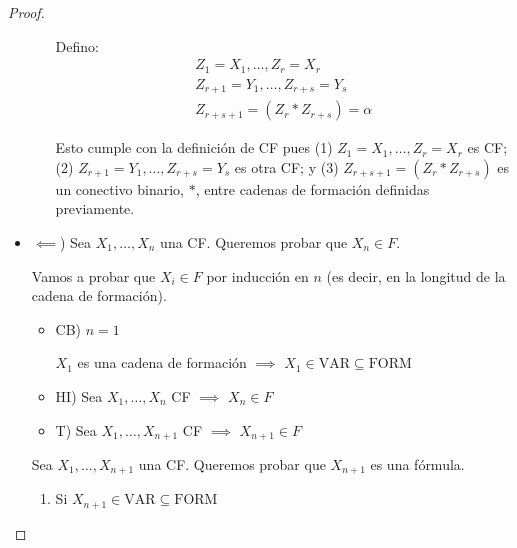 \begin{proof}
\begin{itemize}
\begin{enumerate}
                Defino: 
                \begin{gather*}
                    Z_1 = X_1, \dotsc, Z_r = X_r\\
                    Z_{r+1} = Y_1, \dotsc, Z_{r+s} = Y_s\\
                    Z_{r+s+1} = (Z_r * Z_{r+s}) = \alpha
                \end{gather*}
                
                Esto cumple con la definición de CF pues 
                (1) $Z_1 = X_1, \dotsc, Z_r = X_r$ es CF; 
                (2) $Z_{r+1} = Y_1, \dotsc, Z_{r+s} = Y_s$ es otra CF;
                y (3)
                $Z_{r+s+1} = (Z_r * Z_{r+s})$ 
                es un conectivo binario, $*$, entre
                cadenas de formación definidas previamente.
                
        \end{enumerate}

        \item $\impliedby$) Sea $X_1, \dotsc, X_n$ una CF.
            Queremos probar que $X_n \in F$.


            Vamos a probar que 
            $X_i \in F$ 
            por inducción en $n$ 
            (es decir, en la longitud de la cadena de formación).

            \begin{itemize}
                \item CB) $n=1$ 

                    $X_1$ es una cadena de formación $\implies$
                    $X_1 \in \mathrm{VAR} \subseteq \mathrm{FORM}$

                \item HI) Sea $X_1, \dotsc, X_n$ CF
                    $\implies$ $X_n \in F$
                    
                \item T) Sea $X_1, \dotsc, X_{n+1}$ CF
                    $\implies$ $X_{n+1}\in F$
            \end{itemize}

            Sea $X_1, \dotsc, X_{n+1}$ una CF. Queremos probar que $X_{n+1}$
            es una fórmula.

            \begin{enumerate}[%
                labelindent=*,
                style=multiline,
                leftmargin=*,
                align=left,
                leftmargin=2\parindent,
                label=Caso \arabic*)]
                \item Si $X_{n+1} \in \mathrm{VAR} \subseteq \mathrm{FORM}$


\end{enumerate}
\end{itemize}
\end{proof}
